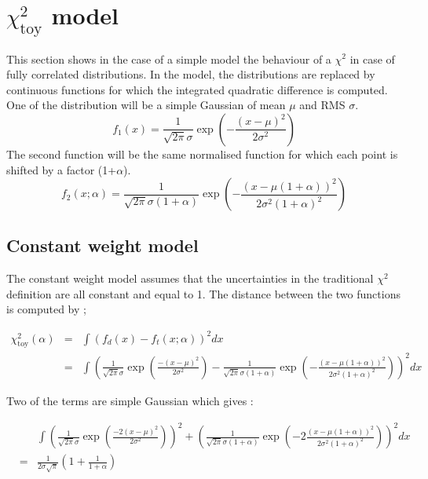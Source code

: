 \chapter{\(\chi^{\text{2}}_{\text{toy}}\) model}
\label{sec:org4a1d604}
\label{ChiToyModel}

This section shows in the case of a simple model the behaviour of a \(\chi^{\text{2}}\) in case of fully correlated distributions.
In the model, the distributions are replaced by continuous functions for which the integrated quadratic difference is computed.
One of the distribution will be a simple Gaussian of mean \(\mu\) and RMS \(\sigma\).
\begin{equation}
f_1(x) = \frac{1}{\sqrt{2\pi}\sigma}\exp\left( -\frac{\left(x-\mu\right)^2}{2\sigma^2}\right)
\end{equation}
The second function will be the same normalised function for which each point is shifted by a factor (1+\(\alpha\)).
\begin{equation}
f_2(x;\alpha)=\frac{1}{\sqrt{2\pi}\sigma(1+\alpha)}\exp\left( -\frac{(x-\mu(1+\alpha))^2}{2\sigma^2(1+\alpha)^2}\right)
\end{equation}

\section{Constant weight model}
\label{sec:org9fa63fa}

The constant weight model assumes that the uncertainties in the traditional \(\chi^{\text{2}}\) definition are all constant and equal to 1.
The distance between the two functions is computed by ;

\begin{equation}
\begin{array}{lcl}
\chi^2_{\text{toy}}(\alpha) &=& \int ( f_d(x) - f_t(x;\alpha))^2 dx\\
&=& \int ( \frac{1}{\sqrt{2\pi}\sigma}\exp\left( \frac{-(x-\mu)^2}{2\sigma^2} \right) - \frac{1}{\sqrt{2\pi}\sigma (1+\alpha)}\exp\left( -\frac{(x-\mu(1+\alpha))^2}{2\sigma^2(1+\alpha)^2}\right) )^2 dx
\end{array}
\end{equation}

Two of the terms are simple Gaussian which gives :

\begin{equation}
\begin{array}{lcl}
& &\int \left(\frac{1}{\sqrt{2\pi}\sigma}\exp\left( \frac{-2(x-\mu)^2}{2\sigma^2} \right)\right)^2 + \left(\frac{1}{\sqrt{2\pi}\sigma (1+\alpha)}\exp\left( -2\frac{(x-\mu(1+\alpha))^2}{2\sigma^2(1+\alpha)^2}\right) \right)^2 dx \\
&=& \frac{1}{2\sigma\sqrt{\pi}}(1 + \frac{1}{1+\alpha} )
\end{array}
\end{equation}


